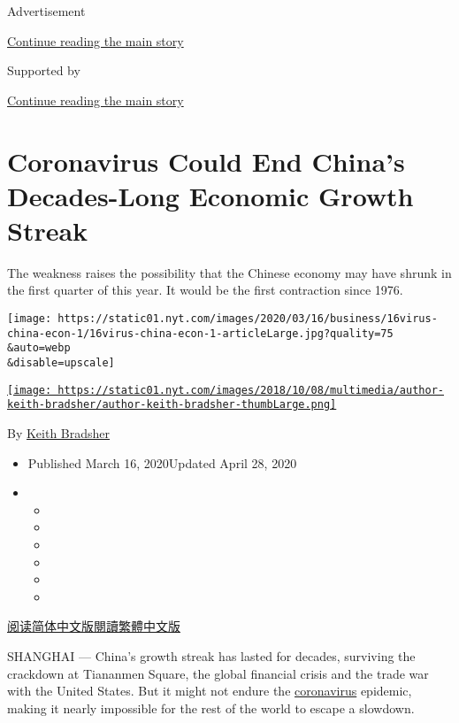 Advertisement

\protect\hyperlink{after-top}{Continue reading the main story}

Supported by

\protect\hyperlink{after-sponsor}{Continue reading the main story}

\hypertarget{coronavirus-could-end-chinas-decades-long-economic-growth-streak}{%
\section{Coronavirus Could End China's Decades-Long Economic Growth
Streak}\label{coronavirus-could-end-chinas-decades-long-economic-growth-streak}}

The weakness raises the possibility that the Chinese economy may have
shrunk in the first quarter of this year. It would be the first
contraction since 1976.

\texttt{[image: https://static01.nyt.com/images/2020/03/16/business/16virus-china-econ-1/16virus-china-econ-1-articleLarge.jpg?quality=75\\\&auto=webp\\\&disable=upscale]}

\href{https://www.nytimes.com/by/keith-bradsher}{\texttt{[image: https://static01.nyt.com/images/2018/10/08/multimedia/author-keith-bradsher/author-keith-bradsher-thumbLarge.png]}}

By \href{https://www.nytimes.com/by/keith-bradsher}{Keith Bradsher}

\begin{itemize}
\item
  Published March 16, 2020Updated April 28, 2020
\item
  \begin{itemize}
  \item
  \item
  \item
  \item
  \item
  \item
  \end{itemize}
\end{itemize}

\href{https://cn.nytimes.com/business/20200317/coronavirus-china-economy/}{阅读简体中文版}\href{https://cn.nytimes.com/business/20200317/coronavirus-china-economy/zh-hant/}{閱讀繁體中文版}

SHANGHAI --- China's growth streak has lasted for decades, surviving the
crackdown at Tiananmen Square, the global financial crisis and the trade
war with the United States. But it might not endure the
\href{https://www.nytimes.com/2020/04/28/business/china-coronavirus-economy.html}{coronavirus}
epidemic, making it nearly impossible for the rest of the world to
escape a slowdown.

